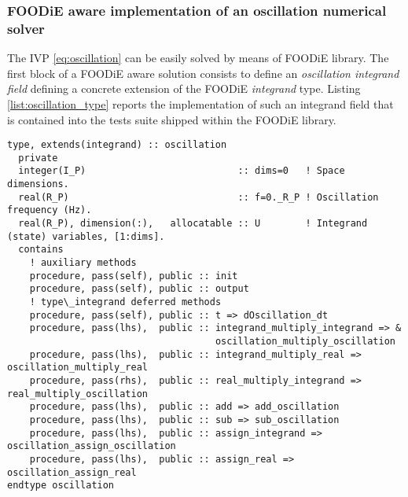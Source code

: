 \subsubsection{FOODiE aware implementation of an oscillation numerical solver}

The IVP \ref{eq:oscillation} can be easily solved by means of FOODiE library. The first block of a FOODiE aware solution consists to define an \emph{oscillation integrand field} defining a concrete extension of the FOODiE \emph{integrand} type. Listing \ref{list:oscillation_type} reports the implementation of such an integrand field that is contained into the tests suite shipped within the FOODiE library.

\begin{lstlisting}[firstnumber=1,style=code,caption={implementation of the \emph{oscillation integrand} type},label={list:oscillation_type}]
type, extends(integrand) :: oscillation
  private
  integer(I_P)                           :: dims=0   ! Space dimensions.
  real(R_P)                              :: f=0._R_P ! Oscillation frequency (Hz).
  real(R_P), dimension(:),   allocatable :: U        ! Integrand (state) variables, [1:dims].
  contains
    ! auxiliary methods
    procedure, pass(self), public :: init
    procedure, pass(self), public :: output
    ! type\_integrand deferred methods
    procedure, pass(self), public :: t => dOscillation_dt
    procedure, pass(lhs),  public :: integrand_multiply_integrand => &
                                     oscillation_multiply_oscillation
    procedure, pass(lhs),  public :: integrand_multiply_real => oscillation_multiply_real
    procedure, pass(rhs),  public :: real_multiply_integrand => real_multiply_oscillation
    procedure, pass(lhs),  public :: add => add_oscillation
    procedure, pass(lhs),  public :: sub => sub_oscillation
    procedure, pass(lhs),  public :: assign_integrand => oscillation_assign_oscillation
    procedure, pass(lhs),  public :: assign_real => oscillation_assign_real
endtype oscillation
\end{lstlisting}

